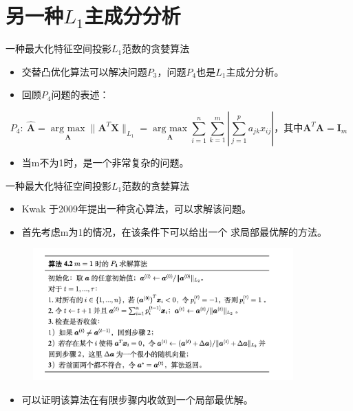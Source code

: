 \section{另一种$L_1$主成分分析}

\begin{frame}{一种最大化特征空间投影$L_1$范数的贪婪算法}
    \begin{itemize}
        \item 交替凸优化算法可以解决问题$P_3$，问题$P_4$也是$L_1$主成分分析。
        \item 回顾$P_4$问题的表述：
    \end{itemize} 
    \small
    \begin{equation}\label{p4}
        P_4: \ \hat{\bm A} = \underset{\bm{A}}{\operatorname{arg \ max}} \| \bm A^T \bm X\|_{L_1}
        = \underset{\bm A}{\operatorname{arg\ max}} 
        \sum_{i=1}^{n}\sum_{k=1}^{m}|\sum_{j=1}^p{a}_{jk}x_{ij}|
         \text{，其中}\bm A^T\bm A = \bm I_m
    \end{equation}
    \begin{itemize}
        \item 当m不为1时，是一个非常复杂的问题。
    \end{itemize} 
\end{frame}

\begin{frame}{一种最大化特征空间投影$L_1$范数的贪婪算法}
    \begin{itemize}
        \item Kwak 于2009年提出一种贪心算法，可以求解该问题。
        \item 首先考虑m为1的情况，在该条件下可以给出一个
        求局部最优解的方法。
    \end{itemize} 
    \begin{figure}
        \includegraphics[width=10cm]{pics/kwak-1.png}
    \end{figure}
    \begin{itemize}
        \item 可以证明该算法在有限步骤内收敛到一个局部最优解。
    \end{itemize} 
\end{frame}

